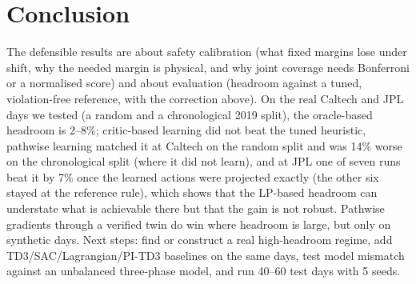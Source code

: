 \documentclass[10pt]{article}
\begin{document}
\section{Conclusion}
The defensible results are about safety calibration (what fixed margins lose under shift, why the needed margin is physical, and why joint coverage needs Bonferroni or a normalised score) and about evaluation (headroom against a tuned, violation-free reference, with the correction above). On the real Caltech and JPL days we tested (a random and a chronological 2019 split), the oracle-based headroom is 2--8\%; critic-based learning did not beat the tuned heuristic, pathwise learning matched it at Caltech on the random split and was 14\% worse on the chronological split (where it did not learn), and at JPL one of seven runs beat it by 7\% once the learned actions were projected exactly (the other six stayed at the reference rule), which shows that the LP-based headroom can understate what is achievable there but that the gain is not robust. Pathwise gradients through a verified twin do win where headroom is large, but only on synthetic days. Next steps: find or construct a real high-headroom regime, add TD3/SAC/Lagrangian/PI-TD3 baselines on the same days, test model mismatch against an unbalanced three-phase model, and run 40--60 test days with 5 seeds.
\end{document}
